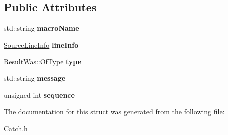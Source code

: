 \subsection*{Public Attributes}
\begin{DoxyCompactItemize}
\item 
\hypertarget{struct_catch_1_1_message_info_a156ade4b3cc731f6ec7b542ae47ba8e3}{std\-::string {\bfseries macro\-Name}}\label{struct_catch_1_1_message_info_a156ade4b3cc731f6ec7b542ae47ba8e3}

\item 
\hypertarget{struct_catch_1_1_message_info_a985165328723e599696ebd8e43195cc5}{\hyperlink{struct_catch_1_1_source_line_info}{Source\-Line\-Info} {\bfseries line\-Info}}\label{struct_catch_1_1_message_info_a985165328723e599696ebd8e43195cc5}

\item 
\hypertarget{struct_catch_1_1_message_info_ae928b9117465c696e45951d9d0284e78}{Result\-Was\-::\-Of\-Type {\bfseries type}}\label{struct_catch_1_1_message_info_ae928b9117465c696e45951d9d0284e78}

\item 
\hypertarget{struct_catch_1_1_message_info_ab6cd06e050bf426c6577502a5c50e256}{std\-::string {\bfseries message}}\label{struct_catch_1_1_message_info_ab6cd06e050bf426c6577502a5c50e256}

\item 
\hypertarget{struct_catch_1_1_message_info_a7f4f57ea21e50160adefce7b68a781d6}{unsigned int {\bfseries sequence}}\label{struct_catch_1_1_message_info_a7f4f57ea21e50160adefce7b68a781d6}

\end{DoxyCompactItemize}


The documentation for this struct was generated from the following file\-:\begin{DoxyCompactItemize}
\item 
Catch.\-h\end{DoxyCompactItemize}
